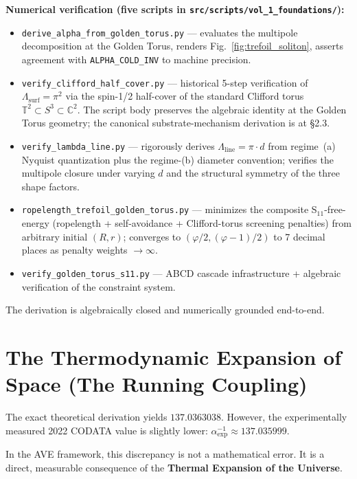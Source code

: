 \textbf{Numerical verification (five scripts in \texttt{src/scripts/vol\_1\_foundations/}):}
\begin{itemize}
    \item \texttt{derive\_alpha\_from\_golden\_torus.py} --- evaluates the multipole decomposition at the Golden Torus, renders Fig.~\ref{fig:trefoil_soliton}, asserts agreement with \texttt{ALPHA\_COLD\_INV} to machine precision.
    \item \texttt{verify\_clifford\_half\_cover.py} --- historical 5-step verification of $\Lambda_{\text{surf}} = \pi^2$ via the spin-1/2 half-cover of the standard Clifford torus $\mathbb{T}^2 \subset S^3 \subset \mathbb{C}^2$. The script body preserves the algebraic identity at the Golden Torus geometry; the canonical substrate-mechanism derivation is at  \S2.3.
    \item \texttt{verify\_lambda\_line.py} --- rigorously derives $\Lambda_{\text{line}} = \pi \cdot d$ from regime~(a) Nyquist quantization plus the regime-(b) diameter convention; verifies the multipole closure under varying $d$ and the structural symmetry of the three shape factors.
    \item \texttt{ropelength\_trefoil\_golden\_torus.py} --- minimizes the composite S$_{11}$-free-energy (ropelength + self-avoidance + Clifford-torus screening penalties) from arbitrary initial $(R, r)$; converges to $(\varphi/2, (\varphi-1)/2)$ to 7 decimal places as penalty weights $\to \infty$.
    \item \texttt{verify\_golden\_torus\_s11.py} --- ABCD cascade infrastructure + algebraic verification of the constraint system.
\end{itemize}
The derivation is algebraically closed and numerically grounded end-to-end.

\section{The Thermodynamic Expansion of Space (The Running Coupling)}
\label{sec:alpha_thermal_running}

The exact theoretical derivation yields $137.0363038$. However, the experimentally measured 2022 CODATA value is slightly lower: $\alpha^{-1}_{\text{exp}} \approx 137.035999$.

In the AVE framework, this discrepancy is not a mathematical error. It is a direct, measurable consequence of the \textbf{Thermal Expansion of the Universe}.

